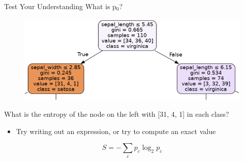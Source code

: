 \documentclass[aspectratio=169]{../latex_main/tntbeamer}  %
\begin{document}
	
	\begin{frame}{Test Your Understanding}
	    What is p$_0$?
	    \begin{figure}
            \centering
            \includegraphics[scale=.5]{Bild47}
	   \end{figure}
	   What is the entropy of the node on the left with [31, 4, 1] in each class?
	   \begin{itemize}
	       \item Try writing out an expression, or try to compute an exact value
	   \end{itemize}
	   \begin{equation*}
            S = -\sum\limits_c p_c\log_2p_c
        \end{equation*}
	\end{frame}
	
\end{document}
